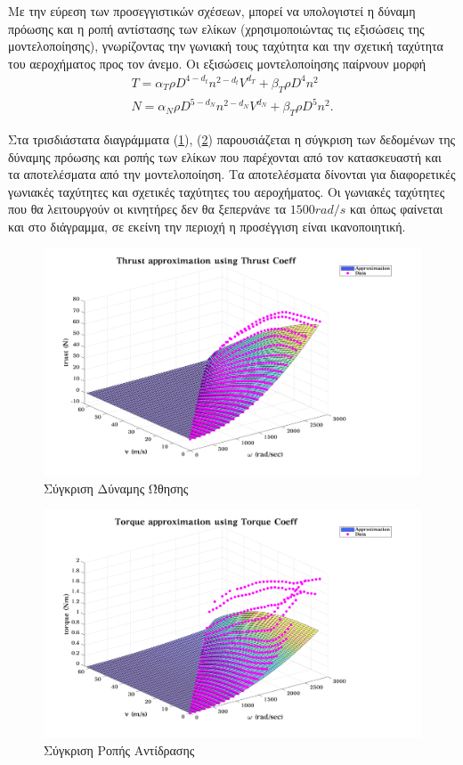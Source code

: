 Με την εύρεση των προσεγγιστικών σχέσεων, μπορεί να υπολογιστεί η δύναμη πρόωσης
και η ροπή αντίστασης των ελίκων (χρησιμοποιώντας τις εξισώσεις της 
μοντελοποίησης), γνωρίζοντας την γωνιακή τους ταχύτητα και την σχετική ταχύτητα 
του αεροχήματος προς τον άνεμο. Οι εξισώσεις μοντελοποίησης παίρνουν μορφή
\begin{gather*}
    T = \alpha_T \rho D^{4 - d_t} n^{2-d_t} V^{d_T} + \beta_T \rho D^4 n^2\\
    N = \alpha_N \rho D^{5 - d_N} n^{2-d_N} V^{d_N} + \beta_T \rho D^5 n^2.
\end{gather*}

Στα τρισδιάστατα διαγράμματα (\ref{surf_T}), (\ref{surf_N}) παρουσιάζεται η 
σύγκριση των δεδομένων της δύναμης πρόωσης και ροπής των ελίκων που παρέχονται 
από τον κατασκευαστή και τα αποτελέσματα από την μοντελοποίηση. Τα αποτελέσματα 
δίνονται για διαφορετικές γωνιακές ταχύτητες και σχετικές ταχύτητες του 
αεροχήματος. Οι γωνιακές ταχύτητες που θα λειτουργούν οι κινητήρες δεν θα 
ξεπερνάνε τα $1500 rad/s$ και όπως φαίνεται και στο διάγραμμα, σε εκείνη την 
περιοχή η προσέγγιση είναι ικανοποιητική.

\begin{figure}[hbt!]
    \centering
    \includegraphics[scale=0.45]{Propeller/fig_surf_T.png}
    \caption{Σύγκριση Δύναμης Ώθησης}\label{surf_T}
\end{figure}

\begin{figure}[H]
    \centering
    \includegraphics[scale=0.45]{Propeller/fig_surf_N.png}
    \caption{Σύγκριση Ροπής Αντίδρασης}\label{surf_N}
\end{figure}

